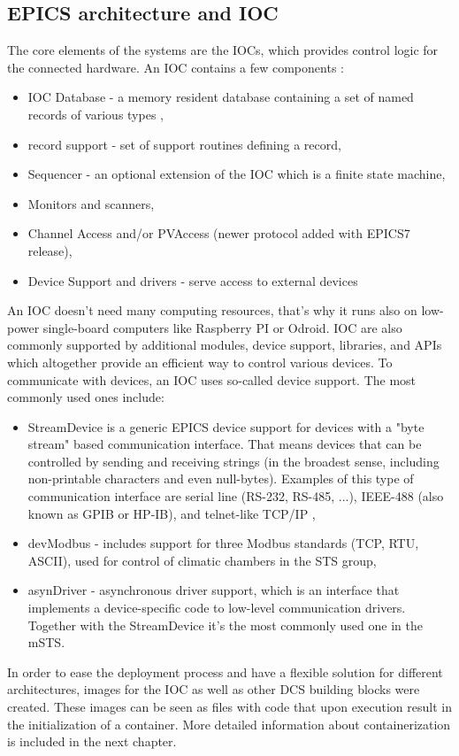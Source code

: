 \subsection{EPICS architecture and IOC}
The core elements of the systems are the \glspl{IOC}, which provides control logic for the connected hardware. An \gls{IOC} contains a few components \cite{IOC}:
\begin{itemize}
    \item \gls{IOC} Database -  a memory resident database containing a set of named records of various types \cite{IOC2},
    \item record support - set of support routines defining a record,
    \item Sequencer - an optional extension of the \gls{IOC} which is a finite state machine,
    \item Monitors and scanners,
    \item Channel Access and/or PVAccess (newer protocol added with EPICS7 release),
    \item Device Support and drivers - serve access to external devices
\end{itemize}
An \gls{IOC} doesn't need many computing resources, that's why it runs also on low-power single-board computers like Raspberry PI or Odroid. 
 \gls{IOC} are also commonly supported by additional modules, device support, libraries, and \glspl{API} which altogether provide an efficient way to control various devices.
To communicate with devices, an \gls{IOC} uses so-called device support. The most commonly used ones include:
\begin{itemize}
    \item StreamDevice is a generic EPICS device support for devices with a "byte stream" based communication interface. That means devices that can be controlled by sending and receiving strings (in the broadest sense, including non-printable characters and even null-bytes). Examples of this type of communication interface are serial line (RS-232, RS-485, ...), IEEE-488 (also known as GPIB or HP-IB), and telnet-like TCP/IP \cite{StreamDevice},
    \item devModbus \cite{modbus} - includes support for three Modbus standards (TCP, RTU, ASCII), used for control of climatic chambers in the \gls{STS} group,
    \item asynDriver \cite{asyn} - asynchronous driver support, which is an interface that implements a device-specific code to low-level communication drivers. Together with the StreamDevice it's the most commonly used one in the \gls{mSTS}. 
\end{itemize}

In order to ease the deployment process and have a flexible solution for different architectures, images for the \gls{IOC} as well as other \gls{DCS} building blocks were created. These images can be seen as files with code that upon execution result in the initialization of a container. More detailed information about containerization is included in the next chapter. 
 
